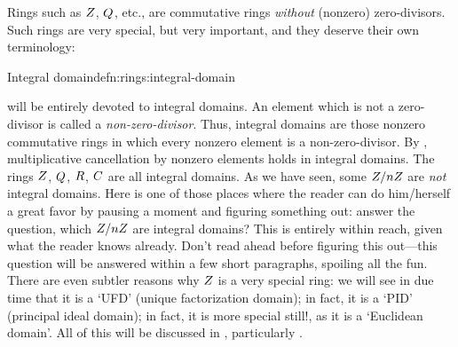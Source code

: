 Rings such as $Z$, $Q$, etc., are commutative rings \emph{without}
(nonzero) zero-divisors.  Such rings are very special, but very
important, and they deserve their own terminology:
\begin{defn}{Integral domain}{defn:rings:integral-domain}
\end{defn}
 will be entirely devoted to integral domains.  An
element which is not a zero-divisor is called a
\emph{non-zero-divisor}. Thus, integral domains are those nonzero
commutative rings in which every nonzero element is a
non-zero-divisor. By ,
multiplicative cancellation by nonzero elements holds in integral
domains. The rings $Z$, $Q$, $R$, $C$ are all integral domains.
As we have seen, some $Z/nZ$ are \emph{not} integral domains.  Here
is one of those places where the reader can do him/herself a great
favor by pausing a moment and figuring something out: answer the
question, which $Z/nZ$ are integral domains? This is entirely within
reach, given what the reader knows already. Don't read ahead before
figuring this out---this question will be answered within a few short
paragraphs, spoiling all the fun.  There are even subtler reasons why
$Z$ is a very special ring: we will see in due time that it is a
`UFD' (unique factorization domain); in fact, it is a `PID' (principal
ideal domain); in fact, it is more special still!, as it is a
`Euclidean domain'. All of this will be discussed in
, particularly
.

